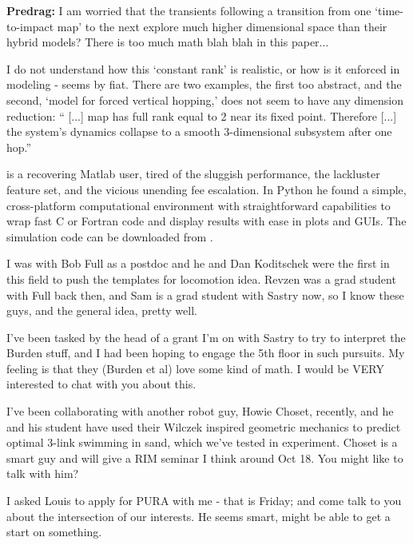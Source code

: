 \begin{description}
{\bf Predrag:} I am worried that the transients following a transition from one
`time-to-impact map' to the next explore much higher dimensional space
than their hybrid models? There is too much math blah blah in this paper...

I do not understand how this `constant rank' is realistic, or
how is it enforced in modeling - seems by fiat. There are two examples,
the first too abstract, and the second, `model for forced
vertical hopping,' does not seem to have any dimension reduction:
``
[...]
\Poincare map has full rank equal to 2 near its fixed point.
Therefore
[...] the system's dynamics collapse
to a smooth 3-dimensional subsystem after one hop.''


 is a
recovering Matlab user, tired of the sluggish performance, the lackluster
feature set, and the vicious unending fee escalation. In Python he found
a simple, cross-platform computational environment with straightforward
capabilities to wrap fast C or Fortran code and display results with ease
in plots and GUIs. The simulation code can be downloaded from
.

\item[2011-09-10 Goldman] I was with Bob Full as a postdoc and he and Dan
Koditschek were the first in this field to push the templates for
locomotion idea. Revzen was a grad student with Full back then, and Sam
is a grad student with Sastry now, so I know these guys, and the general
idea, pretty well.

I've been tasked by the head of a grant I'm on with Sastry to try to
interpret the Burden stuff, and I had been hoping to engage the 5th floor
in such  pursuits. My feeling is that they (Burden et al)  love some kind
of math. I would be VERY interested to chat with you about this.

I've been collaborating with another robot guy, Howie Choset, recently,
and he and his student have used their Wilczek inspired geometric
mechanics to predict optimal 3-link swimming in sand, which we've tested
in experiment. Choset is a smart guy and will give a RIM seminar I think
around Oct 18. You might like to talk with him?

\item[2011-10-05 Predrag 2 Dan Goldman]
I asked Louis to apply for PURA with me - that is Friday;
and come talk to you about the intersection of our interests.
He seems smart, might be able to get a start on something.


\end{description}
